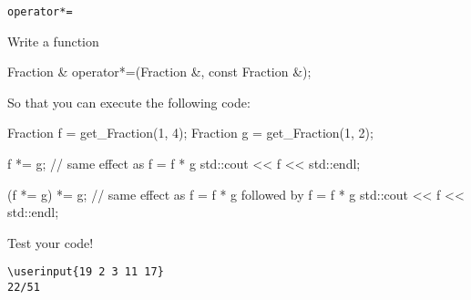 \verb!operator*=!

Write a function
\begin{console}[commandchars=\\\{\}]
Fraction & operator*=(Fraction &, const Fraction &);
\end{console}

So that you can execute the following code:
\begin{console}
Fraction f = get_Fraction(1, 4);
Fraction g = get_Fraction(1, 2);

f *= g; // same effect as f = f * g
std::cout << f << std::endl;

(f *= g) *= g; // same effect as f = f * g followed by f = f * g
std::cout << f << std::endl;
\end{console}

Test your code!

\resett
\nextt
\begin{Verbatim}[frame=single, commandchars=\\\{\}]
\userinput{19 2 3 11 17}
22/51
\end{Verbatim}
